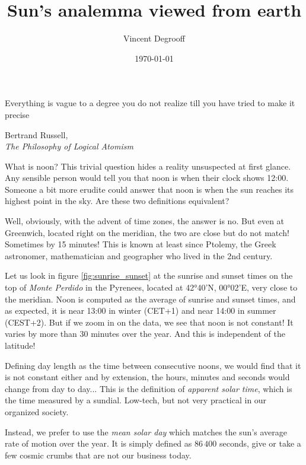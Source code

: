 \documentclass[12pt]{article}
\title{Sun's analemma viewed from earth}
\author{Vincent Degrooff}
\date{\today}
\begin{document}
\maketitle

\setlength{\epigraphwidth}{.45\textwidth}  %
\epigraph{
    Everything is vague to a degree you do not
    realize till you have tried to make it precise
}{Bertrand Russell, \\\textit{The Philosophy of Logical Atomism}}

What is noon? This trivial question hides a reality unsuspected at first glance.
Any sensible person would tell you that noon is when their clock shows 12:00. 
Someone a bit more erudite could answer that noon is when the sun reaches its 
highest point in the sky. Are these two definitions equivalent?

Well, obviously, with the advent of time zones, the answer is no.
But even at Greenwich, located right on the meridian, the two are close but 
do not match! Sometimes by 15 minutes! This is known at least since 
Ptolemy, the Greek astronomer, mathematician and geographer who lived in the 
2nd century.

Let us look in figure \ref{fig:sunrise_sunset} at the sunrise and sunset times 
on the top of \textit{Monte Perdido} in the Pyrenees, located at 42°40'N, 
00°02'E, very close to the meridian. 
Noon is computed as the average of sunrise and sunset times, and as expected, 
it is near 13:00 in winter (CET+1) and near 14:00 in summer (CEST+2). 
But if we zoom in on the data, we see that noon is not constant! It varies by
more than 30 minutes over the year. And this is independent of the latitude!

Defining day length as the time between consecutive noons, we would find that
it is not constant either and by extension, the hours, minutes and 
seconds would change from day to day... This is the definition of 
\textit{apparent solar time}, which is the time measured by a sundial. Low-tech,
but not very practical in our organized society.

Instead, we prefer to use the \textit{mean solar day} which matches the sun's 
average rate of motion over the year. It is simply defined as $86\,400$ seconds,
give or take a few cosmic crumbs that are not our business today.
\end{document}
